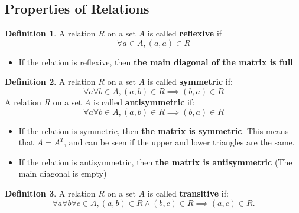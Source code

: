\documentclass[article, 12pt]{article}
\theoremstyle{definition}
\newtheorem{definition}{Definition}[subsection]
\begin{document}
    \subsection{Properties of Relations}
    \begin{definition}
    \label{def:reflexive}
        A relation $R$ on a set $A$ is called \textbf{reflexive} if
        \begin{equation}
            \forall a \in A, (a,a) \in R
        \end{equation}
    \end{definition}
    \begin{itemize}
        \item If the relation is reflexive, then \textbf{the main diagonal of the matrix is full}
    \end{itemize}
    \begin{definition}
    \label{def:symmetric and antisymmetric}
        A relation $R$ on a set $A$ is called \textbf{symmetric} if:
        \begin{equation}
            \forall a \forall b \in A, (a,b) \in R \implies (b,a) \in R
        \end{equation}
        A relation $R$ on a set $A$ is called \textbf{antisymmetric} if:
        \begin{equation}
            \forall a \forall b \in A, (a,b) \in R \implies (b,a) \in R
        \end{equation}
    \end{definition}
    \begin{itemize}
        \item If the relation is symmetric, then \textbf{the matrix is symmetric}. This means that $A = A^T$, and can be seen if the upper and lower triangles are the same.
        \item If the relation is antisymmetric, then \textbf{the matrix is antisymmetric} (The main diagonal is empty)
    \end{itemize} 
    \begin{definition}
    \label{def:transitive}
        A relation $R$ on a set $A$ is called \textbf{transitive} if:
         \begin{equation}
            \forall a \forall b \forall c \in A, (a,b) \in R \land (b,c) \in R \implies (a,c) \in R.
         \end{equation}
    \end{definition}
\end{document}
